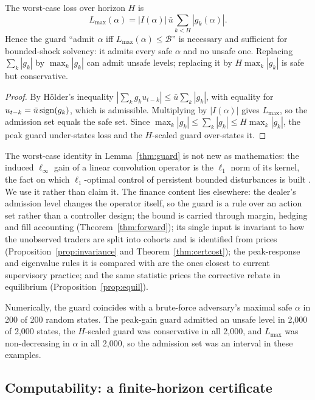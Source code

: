\begin{lemma}\label{thm:guard}
The worst-case loss over horizon $H$ is
\[
L_{\max}(\alpha)=|I(\alpha)|\,\bar u\sum_{k<H}|g_k(\alpha)|.
\]
Hence the guard ``admit $\alpha$ iff $L_{\max}(\alpha)\le\mathcal B$'' is necessary and sufficient for bounded-shock solvency: it admits every safe $\alpha$ and no unsafe one. Replacing $\sum_k|g_k|$ by $\max_k|g_k|$ can admit unsafe levels; replacing it by $H\max_k|g_k|$ is safe but conservative.
\end{lemma}

\begin{proof}
By H\"older's inequality $|\sum_kg_ku_{t-k}|\le\bar u\sum_k|g_k|$, with equality for $u_{t-k}=\bar u\,{\rm sign}(g_k)$, which is admissible. Multiplying by $|I(\alpha)|$ gives $L_{\max}$, so the admission set equals the safe set. Since $\max_k|g_k|\le\sum_k|g_k|\le H\max_k|g_k|$, the peak guard under-states loss and the $H$-scaled guard over-states it.
\end{proof}

The worst-case identity in Lemma~\ref{thm:guard} is not new as mathematics: the induced $\ell_\infty$ gain of a linear convolution operator is the $\ell_1$ norm of its kernel, the fact on which $\ell_1$-optimal control of persistent bounded disturbances is built \citep{vidyasagar1986,dahleh1987,dahleh1995}. We use it rather than claim it. The finance content lies elsewhere: the dealer's admission level changes the operator itself, so the guard is a rule over an action set rather than a controller design; the bound is carried through margin, hedging and fill accounting (Theorem~\ref{thm:forward}); its single input is invariant to how the unobserved traders are split into cohorts and is identified from prices (Proposition~\ref{prop:invariance} and Theorem~\ref{thm:certcost}); the peak-response and eigenvalue rules it is compared with are the ones closest to current supervisory practice; and the same statistic prices the corrective rebate in equilibrium (Proposition~\ref{prop:equil}).

Numerically, the guard coincides with a brute-force adversary's maximal safe $\alpha$ in 200 of 200 random states. The peak-gain guard admitted an unsafe level in 2,000 of 2,000 states, the $H$-scaled guard was conservative in all 2,000, and $L_{\max}$ was non-decreasing in $\alpha$ in all 2,000, so the admission set was an interval in these examples.

\subsection{Computability: a finite-horizon certificate}

